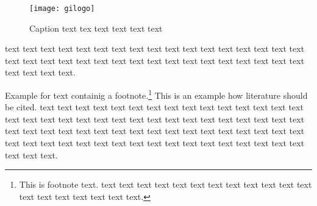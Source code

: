\documentclass[english]{lni}
\begin{document}
\begin{figure}[htb]
  \begin{center}
    \texttt{[image: gilogo]}
    \caption{\label{logo}Caption text tex text text text text}
  \end{center}
\end{figure}

text text text text text text text text text text text text text text text text text text text text text text text text text text text text text text text text text text text text text text.

Example for text containig a footnote.\footnote{This is footnote text. text text text text text text text text text text text text text text text text text text text.} This is an example how literature \cite{Ez99,ABC01} should be cited. text text text text text text text text text text text text text text text text text text text text text text text text text text text text  text text text text text text text text text text text text text text text text text text text text text text text text text text text text text text text text text text text text text text text text text.


\end{document}
